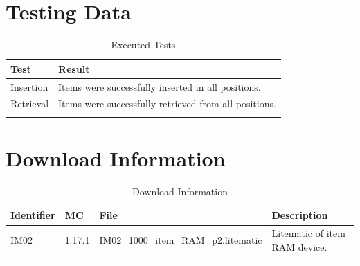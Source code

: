 \documentclass[10pt]{datasheet}
\begin{document}
\section{Testing Data}

\begin{table}[h]
\caption{Executed Tests}
\begin{tabularx}{\textwidth}{l | X}
    \thickhline
    \textbf{Test} & \textbf{Result} \\
    \hline
    Insertion & Items were successfully inserted in all positions. \\
    \hline
    Retrieval & Items were successfully retrieved from all positions. \\
    \thickhline
\end{tabularx}
\end{table}

\section{Download Information}
\begin{table}[h]
    \caption{Download Information}
    \begin{tabularx}{\textwidth}{l | l | l | X}
        \thickhline
        \textbf{Identifier} & \textbf{MC} & \textbf{File} & \textbf{Description} \\
        \hline
        IM02 & 1.17.1 & IM02\_1000\_item\_RAM\_p2.litematic & Litematic of item RAM device. \\
        \thickhline
    \end{tabularx}
\end{table}
\end{document}
